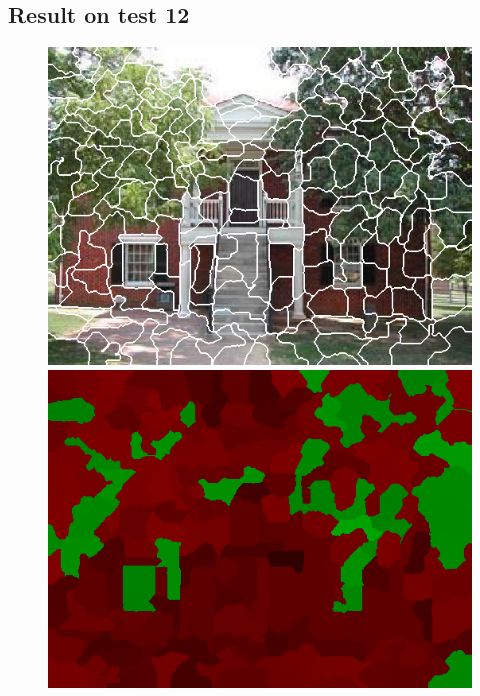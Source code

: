 \documentclass[a4paper,titlepaget]{article}
\begin{document}
\subsection{Result on test 12}
\begin{figure}[htpb] 
	\centering
	\begin{minipage}{.3\textwidth}
		\includegraphics[width=1.7\textwidth]{images/results/12seg} 
	\end{minipage}
	\hspace{.25\textwidth}
	\begin{minipage}{.3\textwidth}
		\includegraphics[width=1.7\textwidth]{images/results/12map}
	\end{minipage}  
\end{figure}
\end{document}
